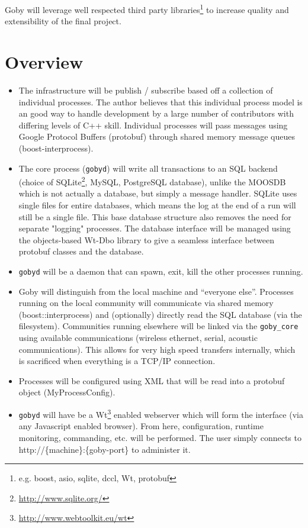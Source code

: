 \documentclass[10pt,letterpaper]{article}
\begin{document}
Goby will leverage well respected third party libraries\footnote{e.g. boost, asio, sqlite, dccl, Wt, protobuf} to increase quality and extensibility of the final project. 

\section{Overview}

\begin{itemize}
\item The infrastructure will be publish / subscribe based off a collection of individual processes. The author believes that this individual process model is an good way to handle development by a large number of contributors with differing levels of C++ skill. Individual processes will pass messages using Google Protocol Buffers (protobuf) through shared memory message queues (boost-interprocess).
\item The core process (\verb|gobyd|) will write all transactions to an SQL backend (choice of SQLite\footnote{\url{http://www.sqlite.org/}}, MySQL, PostgreSQL database), unlike the MOOSDB which is not actually a database, but simply a message handler. SQLite uses single files for entire databases, which means the log at the end of a run will still be a single file. This base database structure also removes the need for separate "logging" processes. The database interface will be managed using the objects-based Wt-Dbo library to give a seamless interface between protobuf classes and the database.
\item \verb|gobyd| will be a daemon that can spawn, exit, kill the other processes running.
\item Goby will distinguish from the local machine and ``everyone else''. Processes running on the local community will communicate via shared memory (boost::interprocess) and (optionally) directly read the SQL database (via the filesystem). Communities running elsewhere will be linked via the \verb|goby_core| using available communications (wireless ethernet, serial, acoustic communications). This allows for very high speed transfers internally, which is sacrificed when everything is a TCP/IP connection. 
\item Processes will be configured using XML that will be read into a protobuf object (MyProcessConfig).
\item \verb|gobyd| will have be a Wt\footnote{\url{http://www.webtoolkit.eu/wt}} enabled webserver which will form the interface (via any Javascript enabled browser). From here, configuration, runtime monitoring, commanding, etc. will be performed. The user simply connects to http://\{machine\}:\{goby-port\} to administer it. 
\end{itemize}
\end{document}
